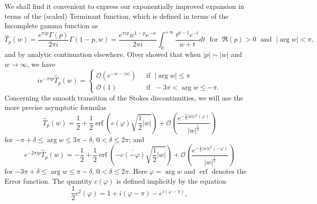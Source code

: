 \documentclass[a4paper,twoside,10pt]{amsart}
\numberwithin{equation}{section}
\begin{document}
We shall find it convenient to express our exponentially improved expansion in terms of the (scaled) Terminant function, which is defined in terms of the Incomplete gamma function as
\[
\widehat T_p \left( w \right) = \frac{{e^{\pi ip} \Gamma \left( p \right)}}{{2\pi i}}\Gamma \left( {1 - p,w} \right) = \frac{e^{\pi ip} w^{1 - p} e^{ - w} }{2\pi i}\int_0^{ + \infty } {\frac{{t^{p - 1} e^{ - t} }}{w + t}dt} \; \text{ for } \; \Re\left(p\right)>0 \; \text{ and } \; \left| \arg w \right| < \pi ,
\]
and by analytic continuation elsewhere. Olver \cite[equations (4.5) and (4.6)]{Olver4} showed that when $\left|p\right| \sim \left|w\right|$ and $w \to \infty$, we have
\begin{equation}\label{eq11}
ie^{ - \pi ip} \widehat T_p \left( w \right) = \begin{cases} \mathcal{O}\left( {e^{ - w - \left| w \right|} } \right) & \; \text{ if } \; \left| {\arg w} \right| \le \pi \\ \mathcal{O}\left(1\right) & \; \text{ if } \; - 3\pi  < \arg w \le  - \pi. \end{cases}
\end{equation}
Concerning the smooth transition of the Stokes discontinuities, we will use the more precise asymptotic formulas
\begin{equation}\label{eq12}
\widehat T_p \left( w \right) = \frac{1}{2} + \frac{1}{2}\mathop{\text{erf}} \left( {c\left( \varphi  \right)\sqrt {\frac{1}{2}\left| w \right|} } \right) + \mathcal{O}\left( {\frac{{e^{ - \frac{1}{2}\left| w \right|c^2 \left( \varphi  \right)} }}{{\left| w \right|^{\frac{1}{2}} }}} \right)
\end{equation}
for $-\pi +\delta \leq \arg w \leq 3 \pi -\delta$, $0 < \delta  \le 2\pi$; and
\begin{equation}\label{eq13}
e^{ - 2\pi ip} \widehat T_p \left( w \right) =  - \frac{1}{2} + \frac{1}{2}\mathop{\text{erf}} \left( { - \overline {c\left( { - \varphi } \right)} \sqrt {\frac{1}{2}\left| w \right|} } \right) + \mathcal{O}\left( {\frac{{e^{ - \frac{1}{2}\left| w \right|\overline {c^2 \left( { - \varphi } \right)} } }}{{\left| w \right|^{\frac{1}{2}} }}} \right)
\end{equation}
for $- 3\pi  + \delta  \le \arg w \le \pi  - \delta$, $0 < \delta \le 2\pi$. Here $\varphi = \arg w$ and $\mathop{\text{erf}}$ denotes the Error function. The quantity $c\left( \varphi  \right)$ is defined implicitly by the equation
\[
\frac{1}{2}c^2 \left( \varphi  \right) = 1 + i\left( {\varphi  - \pi } \right) - e^{i\left( {\varphi  - \pi } \right)},
\]
\end{document}

